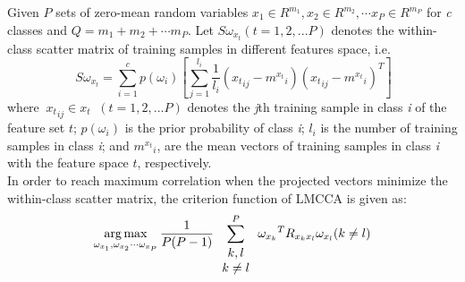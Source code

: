 \documentclass[journal]{IEEEtran}
\begin{document}
Given \emph{$ P $} sets of zero-mean random variables ${x_1} \in {R^{{m_1}}},{x_2} \in {R^{{m_2}}}, \cdots {x_P} \in {R^{{m_P}}}$ for \emph{c} classes and $Q = {m_1} + {m_2} +  \cdots {m_P} $. Let $ {S{\omega_{{x_t}}}} (t=1,2,...P) $ denotes the within-class scatter matrix of training samples in different features space, i.e. \\
\begin{equation}\ S{\omega_{{x_t}}} = \sum\limits_{i = 1}^c {p({\omega _i})\left[ {\sum\limits_{j = 1}^{{l_i}} {\frac{1}{{{l_i}}}({x_t}_{ij} - {m^{{x_t}}}_i){{({x_t}_{ij} - {m^{{x_t}}}_i)}^T}} } \right]} \end{equation}
where $ \ {x_t}_{ij} \in {x_t} \ $ $(t=1,2,...P)$ %
denotes the \textit{j}th training sample in class \textit{i} of the feature set $t$; $ p({\omega _i})$ is the prior probability of class \textit{i}; $ \textit{l}_\textit{i}$ is the number of training samples in class \textit{i}; and $ {m^{x_t}}_i $, %
 are the mean vectors of training samples in class \textit{i} with the feature space $t$, respectively. \\\indent
In order to reach maximum correlation when the projected vectors minimize the within-class scatter matrix, the criterion function of LMCCA is given as: \\
\begin{equation}
\mathop {\arg \max }\limits_{{\omega _{{x_1}}},{\omega _{{x_2}}} \cdots {\omega _{{x_P}}}} \frac{1}{{P(P - 1)}}\sum\limits_{\begin{array}{*{20}{c}}
   {k,l}  \\
   {k \ne l{\rm{ }}}  \\
\end{array}}^{{P}} {{\omega _{x_k}}^T{R_{x_kx_l}}{\omega _{x_l}}(k \ne l)}
\end{equation}\\
\end{document}
